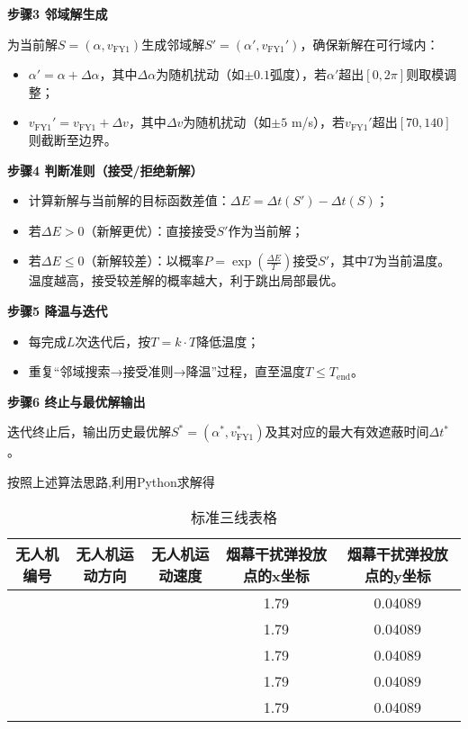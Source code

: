 \documentclass[../main.tex]{subfiles}
\begin{document}
\noindent\textbf{步骤3 邻域解生成}

为当前解$S=(\alpha, v_{\text{FY1}})$生成邻域解$S'=(\alpha', v_{\text{FY1}}')$，确保新解在可行域内：
\begin{itemize}
    \item $\alpha' = \alpha + \Delta\alpha$，其中$\Delta\alpha$为随机扰动（如$\pm0.1$弧度），若$\alpha'$超出$[0,2\pi]$则取模调整；
    \item $v_{\text{FY1}}' = v_{\text{FY1}} + \Delta v$，其中$\Delta v$为随机扰动（如$\pm5$ m/s），若$v_{\text{FY1}}'$超出$[70,140]$则截断至边界。
\end{itemize}

\noindent\textbf{步骤4 判断准则（接受/拒绝新解）}
\begin{itemize}
    \item 计算新解与当前解的目标函数差值：$\Delta E = \Delta t(S') - \Delta t(S)$；
    \item 若$\Delta E > 0$（新解更优）：直接接受$S'$作为当前解；
    \item 若$\Delta E \leq 0$（新解较差）：以概率$P = \exp\left(\frac{\Delta E}{T}\right)$接受$S'$，其中$T$为当前温度。温度越高，接受较差解的概率越大，利于跳出局部最优。
\end{itemize}

\noindent\textbf{步骤5 降温与迭代}
\begin{itemize}
    \item 每完成$L$次迭代后，按$T = k \cdot T$降低温度；
    \item 重复“邻域搜索→接受准则→降温”过程，直至温度$T \leq T_{\text{end}}$。
\end{itemize}

\noindent\textbf{步骤6 终止与最优解输出}

迭代终止后，输出历史最优解$S^*=(\alpha^*, v_{\text{FY1}}^*)$及其对应的最大有效遮蔽时间$\Delta t^*$。

按照上述算法思路,利用Python求解得

\begin{table}[H]
\caption{标准三线表格}
\label{tab:001} 
\centering
\begin{small}
\begin{tabular}{ccccc}
\toprule[1.5pt]
无人机编号 &无人机运动方向 & 无人机运动速度  & 烟幕干扰弹投放点的x坐标& 烟幕干扰弹投放点的y坐标 \\
\midrule[1pt]
 &             &                      & 1.79                    & 0.04089     \\            
 &             &                       & 1.79                    & 0.04089      \\           
 &             &                     & 1.79                    & 0.04089      \\           
 &             &                     & 1.79                    & 0.04089       \\          
 &             &                    & 1.79                    & 0.04089      \\            
\bottomrule[1.5pt]
\end{tabular}
\end{small}
\end{table}
\end{document}
